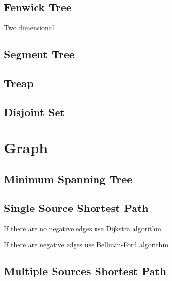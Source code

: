 \documentclass[a4paper,11pt]{article}
\begin{document}
  \subsection{Fenwick Tree}
    
    Two dimensional
    
  
  \subsection{Segment Tree}
        
    
  \subsection{Treap}
    
  
  \subsection{Disjoint Set}
        

\section{Graph}
  \subsection{Minimum Spanning Tree}
    

  \subsection{Single Source Shortest Path}
    If there are no negative edges use Dijkstra algorithm
        
    
    If there are negative edges use Bellman-Ford algorithm
    

  \subsection{Multiple Sources Shortest Path}
    
  
\end{document}
